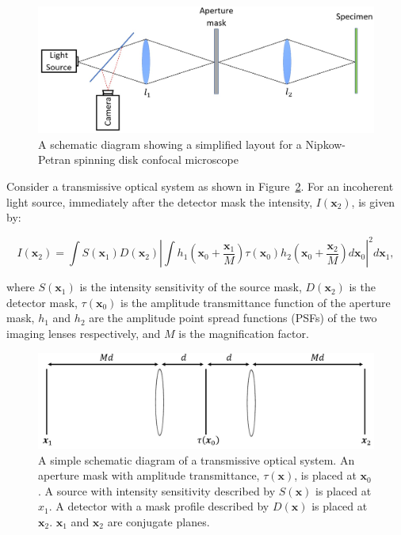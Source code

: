 \begin{figure}[h]
	\centering
	\includegraphics[width=\textwidth]{images/confocal_schematic.jpg}
	\caption[Simplified Nipkow-Petran confocal layout]{A schematic diagram showing a simplified layout for a Nipkow-Petran spinning disk confocal microscope}
	\label{fig:confocal_schematic}
\end{figure}

Consider a transmissive optical system as shown in 
Figure~\ref{fig:optical_system_schematic}. For an incoherent 
light source, immediately after the detector mask the 
intensity, $I\left(\textbf{x}_{2}\right)$, is given by:

\begin{equation}\label{eq:intensity_after_detector}
I\left(\textbf{x}_{2}\right) = \int S\left(\textbf{x}_{1}\right) D\left(\textbf{x}_{2}\right) \left| \int h_{1}\left(\textbf{x}_{0} + \frac{\textbf{x}_{1}}{M}\right) \tau\left(\textbf{x}_{0}\right) h_{2}\left(\textbf{x}_{0} + \frac{\textbf{x}_{2}}{M}\right)d\textbf{x}_{0}\right|^{2}d\textbf{x}_{1},
\end{equation}

where $S\left(\textbf{x}_{1}\right)$ is the intensity 
sensitivity of the source mask, $D\left(\textbf{x}_{2}\right)$ 
is the detector mask, $\tau\left(\textbf{x}_{0}\right)$ is 
the amplitude transmittance function of the aperture mask, 
$h_{1}$ and $h_{2}$ are the amplitude point spread functions 
(PSFs) of the two imaging lenses respectively, and $M$ is the 
magnification factor. 

\begin{figure}[h]
	\centering
	\includegraphics[width=\textwidth]{images/optical_system_schematic.jpg}
	\caption[A simple schematic diagram of a transmissive optical system]{A simple schematic diagram of a transmissive optical system. An aperture mask with amplitude transmittance, $\tau\left(\textbf{x}\right)$, is placed at $\textbf{x}_{0}$. A source with intensity sensitivity described by $S\left(\textbf{x}\right)$ is placed at ${x}_{1}$. A detector with a mask profile described by $D\left(\textbf{x}\right)$ is placed at $\textbf{x}_{2}$. $\textbf{x}_{1}$ and $\textbf{x}_{2}$ are conjugate planes.}
	\label{fig:optical_system_schematic}
\end{figure}

